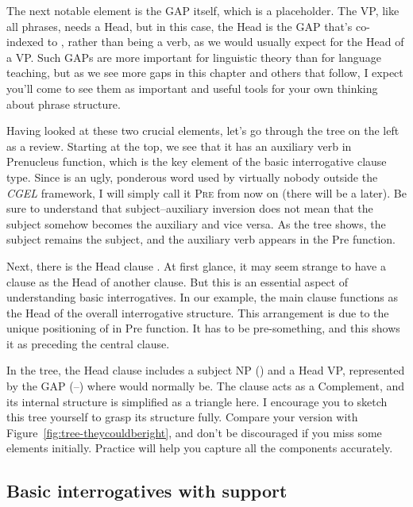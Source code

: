 The next notable element is the GAP itself, which is a placeholder. The VP, like all phrases, needs a \textsf{Head}, but in this case, the \textsf{Head} is the GAP that's co-indexed to , rather than being a verb, as we would usually expect for the \textsf{Head} of a VP. Such GAPs are more important for linguistic theory than for language teaching, but as we see more gaps in this chapter and others that follow, I expect you'll come to see them as important and useful tools for your own thinking about phrase structure.

Having looked at these two crucial elements, let's go through the tree on the left as a review. Starting at the top, we see that it has an auxiliary verb  in \textsf{Prenucleus} function, which is the key element of the basic interrogative clause type. Since  is an ugly, ponderous word used by virtually nobody outside the \textit{CGEL} framework, I will simply call it \textsc{Pre} from now on (there will be a  later). Be sure to understand that subject--auxiliary inversion does not mean that the subject somehow becomes the auxiliary and vice versa. As the tree shows, the subject remains the subject, and the auxiliary verb appears in the \textsf{Pre} function.


Next, there is the \textsf{Head} clause . At first glance, it may seem strange to have a clause as the \textsf{Head} of another clause. But this is an essential aspect of understanding basic interrogatives. In our example, the main clause functions as the \textsf{Head} of the overall interrogative structure. This arrangement is due to the unique positioning of  in \textsf{Pre} function. It has to be pre-something, and this shows it as preceding the central clause.

In the tree, the \textsf{Head} clause includes a subject NP () and a \textsf{Head} VP, represented by the GAP (--) where  would normally be. The clause  acts as a \textsf{Complement}, and its internal structure is simplified as a triangle here. I encourage you to sketch this tree yourself to grasp its structure fully. Compare your version with Figure~\ref{fig:tree-theycouldberight}, and don't be discouraged if you miss some elements initially. Practice will help you capture all the components accurately.

\subsection{Basic interrogatives with  support}

